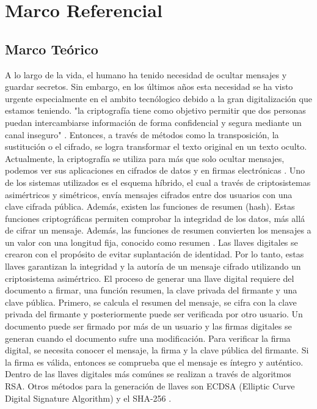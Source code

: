 \documentclass{amsart}
\begin{document}
        




\section{Marco Referencial}
    \subsection{Marco Teórico}
    
    A lo largo de la vida, el humano ha tenido necesidad de ocultar mensajes y guardar secretos. Sin embargo, en los últimos años esta necesidad se ha visto urgente especialmente en el ambito tecnólogico debido a la gran digitalización que estamos teniendo. "la criptografía tiene como objetivo permitir que dos personas puedan intercambiarse información de forma confidencial y segura mediante un canal inseguro" \parencite{Hernandez}. Entonces, a través de métodos como la transposición, la sustitución o el cifrado, se logra transformar el texto original en un texto oculto. Actualmente, la criptografía se utiliza para más que solo ocultar mensajes, podemos ver sus aplicaciones en cifrados de datos y en firmas electrónicas \parencite{Hernandez}. 
    Uno de los sistemas utilizados es el esquema híbrido, el cual a través de criptosistemas asimértricos y simétricos, envía mensajes cifrados entre dos usuarios con una clave cifrada pública. Además, existen las funciones de resumen (hash). Estas funciones criptográficas permiten comprobar la integridad de los datos, más allá de cifrar un mensaje. Además, las funciones de resumen convierten los mensajes a un valor con una longitud fija, conocido como resumen \parencite{Hernandez}.
    Las llaves digitales se crearon con el propósito de evitar suplantación de identidad. Por lo tanto, estas llaves garantizan la integridad y la autoría de un mensaje cifrado utilizando un criptosistema asimértrico. El proceso de generar una llave digital requiere del documento a firmar, una función resumen, la clave privada del firmante y una clave pública. Primero, se calcula el resumen del mensaje, se cifra con la clave privada del firmante y posteriormente puede ser verificada por otro usuario. Un documento puede ser firmado por más de un usuario y las firmas digitales se generan cuando el documento sufre una modificación. Para verificar la firma digital, se necesita conocer el mensaje, la firma y la clave pública del firmante. Si la firma es válida, entonces se comprueba que el mensaje es íntegro y auténtico. Dentro de las llaves digitales más comúnes se realizan a través de algoritmos RSA. Otros métodos para la generación de llaves son ECDSA (Elliptic Curve Digital Signature Algorithm) y el SHA-256 \parencite{Cryptography}.
\end{document}
